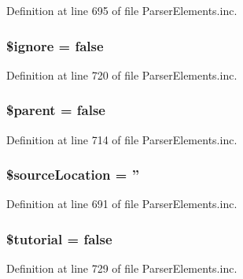 \-Definition at line 695 of file \-Parser\-Elements.\-inc.

\hypertarget{classparser_class_a442f628e2139e0335194a8e88fc3bd63}{
\subsubsection[{\$ignore}]{\setlength{\rightskip}{0pt plus 5cm}\$ignore = false}}\label{classparser_class_a442f628e2139e0335194a8e88fc3bd63}


\-Definition at line 720 of file \-Parser\-Elements.\-inc.

\hypertarget{classparser_class_a4e2313a4b35b72a06ac45fd38960f677}{
\subsubsection[{\$parent}]{\setlength{\rightskip}{0pt plus 5cm}\$parent = false}}\label{classparser_class_a4e2313a4b35b72a06ac45fd38960f677}


\-Definition at line 714 of file \-Parser\-Elements.\-inc.

\hypertarget{classparser_class_a998b4c54041db5cd50185166322ad3ca}{
\subsubsection[{\$source\-Location}]{\setlength{\rightskip}{0pt plus 5cm}\$source\-Location = ''}}\label{classparser_class_a998b4c54041db5cd50185166322ad3ca}


\-Definition at line 691 of file \-Parser\-Elements.\-inc.

\hypertarget{classparser_class_a78498c66c97cfd4c420a7f2908b65f24}{
\subsubsection[{\$tutorial}]{\setlength{\rightskip}{0pt plus 5cm}\$tutorial = false}}\label{classparser_class_a78498c66c97cfd4c420a7f2908b65f24}


\-Definition at line 729 of file \-Parser\-Elements.\-inc.

